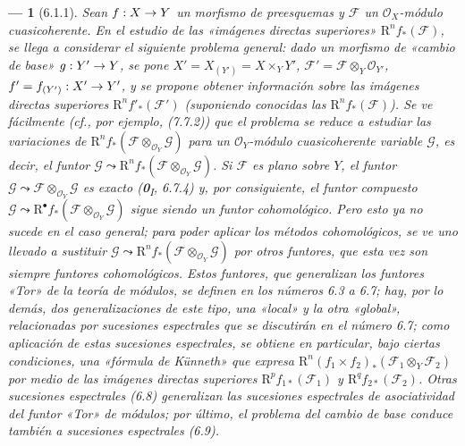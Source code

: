 \documentclass[10pt,oneside,openany]{book}
\theoremstyle{egaenv}\newtheorem*{env}{---}
\theoremstyle{egastatement}
\theoremstyle{egadescription}
\renewcommand{\to}{\mathchoice{\longrightarrow}{\rightarrow}{\rightarrow}{\rightarrow}}
\begin{document}
\begin{env}[6.1.1]
\label{III.6.1.1}
Sean $f:X\to Y$ un morfismo de preesquemas y $\mathscr F$ un
$\mathscr O_X$-módulo cuasicoherente. En el estudio de las «imágenes
directas superiores» $\mathrm R^n f_*(\mathscr F)$, se llega a considerar el
siguiente problema general: dado un morfismo de «cambio de base»
$g:Y'\to Y$, se pone
$X'=X_{(Y')}=X\times_Y Y'$, $\mathscr F'=\mathscr F\otimes_Y\mathscr O_{Y'}$, $f'=f_{(Y')}:X'\to Y'$,
y se propone obtener información sobre las imágenes directas
superiores $\mathrm R^n f'_*(\mathscr F')$ (suponiendo conocidas las
$\mathrm R^n f_*(\mathscr F)$). Se ve fácilmente (cf., por ejemplo, (7.7.2))
que el problema se reduce a estudiar las variaciones de
$\mathrm R^n f_*(\mathscr F\otimes_{\mathscr O_Y}\mathscr G)$ para un
$\mathscr O_Y$-\emph{módulo} cuasicoherente variable $\mathscr G$, es decir, el
funtor
$\mathscr G\leadsto\mathrm R^n f_*(\mathscr F\otimes_{\mathscr O_Y}\mathscr G)$.
Si $\mathscr F$ es \emph{plano} sobre $Y$, el funtor
$\mathscr G\leadsto\mathscr F\otimes_{\mathscr O_Y}\mathscr G$ es \emph{exacto}
(\textbf{0}\textsubscript{I}, 6.7.4) y, por consiguiente, el funtor compuesto
$\mathscr G\leadsto\mathrm R^\bullet f_*(\mathscr F\otimes_{\mathscr O_Y}\mathscr G)$
sigue siendo un funtor \emph{cohomológico}. Pero esto ya no sucede en el caso
general; para poder aplicar los métodos cohomológicos, se ve uno llevado a
sustituir
$\mathscr G\leadsto\mathrm R^n f_*(\mathscr F\otimes_{\mathscr O_Y}\mathscr G)$
por otros funtores, que esta vez son \emph{siempre} funtores cohomológicos. Estos
funtores, que generalizan los funtores «Tor» de la teoría de módulos, se
definen en los números 6.3 a 6.7; hay, por lo demás, dos generalizaciones de
este tipo, una «local» y la otra «global», relacionadas por sucesiones
espectrales que se discutirán en el número 6.7; como aplicación de estas
sucesiones espectrales, se obtiene en particular, bajo ciertas condiciones,
una «fórmula de Künneth» que expresa
$\mathrm R^n(f_1\times f_2)_*(\mathscr F_1\otimes_Y\mathscr F_2)$
por medio de las imágenes directas superiores
$\mathrm R^p f_{1*}(\mathscr F_1)$ y $\mathrm R^q f_{2*}(\mathscr F_2)$.
Otras sucesiones espectrales (6.8) generalizan las sucesiones espectrales de
asociatividad del funtor «Tor» de módulos; por último, el problema del cambio
de base conduce también a sucesiones espectrales (6.9).
\end{env}
\end{document}
